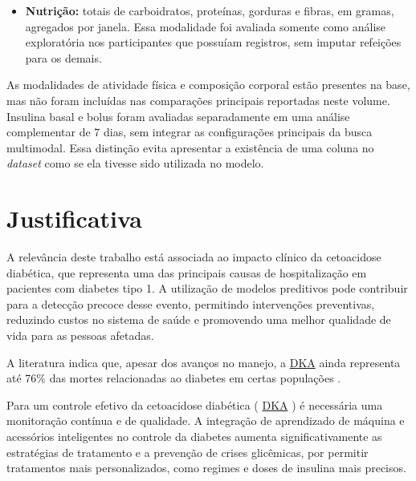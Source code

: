 \documentclass[12pt,a4paper]{article}
\DeclareRobustCommand{\sigla}[1]{%
    \texorpdfstring{\hyperlink{sigla:#1}{#1}}{#1}%
}
\begin{document}
\begin{itemize}
    sono agregados por dia, com duração total e segundos classificados como
    profundo, leve, REM, acordado e não mensurável, além do número de episódios.
    A Garmin descreve esses estágios como estimativas que combinam frequência
    cardíaca, \sigla{HRV}, respiração e movimento, não como medições diretas da
    atividade cerebral usada na polissonografia
    \cite{garminsleep2026}. Por isso, esses valores são tratados como atributos
    contextuais exploratórios.
    \item \textbf{Nutrição:} totais de carboidratos, proteínas, gorduras e
    fibras, em gramas, agregados por janela. Essa modalidade foi avaliada
    somente como análise exploratória nos participantes que possuíam registros,
    sem imputar refeições para os demais.
\end{itemize}

As modalidades de atividade física e composição corporal estão presentes na
base, mas não foram incluídas nas comparações principais reportadas neste
volume. Insulina basal e bolus foram avaliadas separadamente em uma análise
complementar de 7 dias, sem integrar as configurações principais da busca
multimodal. Essa distinção evita apresentar a existência de uma coluna no
\textit{dataset} como se ela tivesse sido utilizada no modelo.

\section{Justificativa}

A relevância deste trabalho está associada ao impacto clínico da cetoacidose diabética, que representa uma das principais causas de hospitalização em pacientes com diabetes tipo 1. A utilização de modelos preditivos pode contribuir para a detecção precoce desse evento, permitindo intervenções preventivas, reduzindo custos no sistema de saúde e promovendo uma melhor qualidade de vida para as pessoas afetadas.

A literatura indica que, apesar dos avanços no manejo, a \sigla{DKA} ainda representa até 76\% das mortes relacionadas ao diabetes em certas populações \cite{alsamhori2025}.

Para um controle efetivo da cetoacidose diabética (\sigla{DKA}) é necessária uma monitoração contínua e de qualidade. A integração de aprendizado de máquina e acessórios inteligentes no controle da diabetes aumenta significativamente as estratégias de tratamento e a prevenção de crises glicêmicas, por permitir tratamentos mais personalizados, como regimes e doses de insulina mais precisos.
\end{document}
